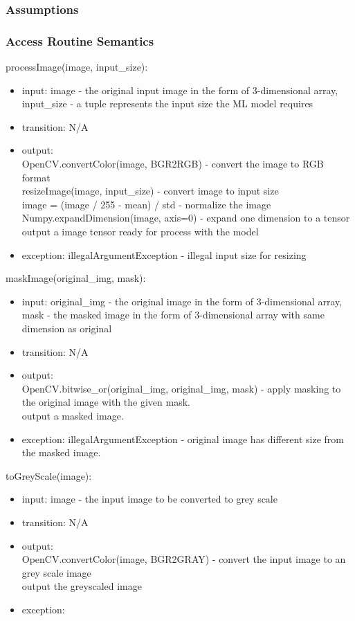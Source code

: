 \documentclass[12pt, titlepage]{article}
\begin{document}
\subsubsection{Assumptions}

\subsubsection{Access Routine Semantics}
\noindent processImage(image, input\_size):
\begin{itemize}
\item input: image - the original input image in the form of 3-dimensional array, input\_size - a tuple represents the input size the ML model requires
\item transition: N/A
\item output: \\
OpenCV.convertColor(image, BGR2RGB) - convert the image to RGB format \\ resizeImage(image, input\_size) - convert image to input size \\
image = (image / 255 - mean) / std - normalize the image \\
Numpy.expandDimension(image, axis=0) - expand one dimension to a tensor \\
output a image tensor ready for process with the model
\item exception: illegalArgumentException - illegal input size for resizing
\end{itemize}

\noindent maskImage(original\_img, mask):
\begin{itemize}
\item input: original\_img - the original image in the form of 3-dimensional array, mask - the masked image in the form of 3-dimensional array with same dimension as original
\item transition: N/A
\item output: \\
OpenCV.bitwise\_or(original\_img, original\_img, mask) - apply masking to the original image with the given mask. \\
output a masked image.
\item exception: illegalArgumentException - original image has different size from the masked image.
\end{itemize}

\noindent toGreyScale(image):
\begin{itemize}
\item input: image - the input image to be converted to grey scale
\item transition: N/A
\item output: \\
OpenCV.convertColor(image, BGR2GRAY) - convert the input image to an grey scale image \\
output the greyscaled image
\item exception: 
\end{itemize}
\end{document}
